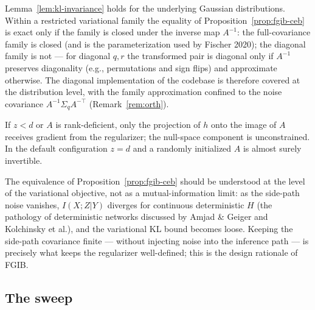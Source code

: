 \begin{remark}\label{rem:closure}
Lemma~\ref{lem:kl-invariance} holds for the underlying Gaussian distributions. Within a
restricted variational family the equality of Proposition~\ref{prop:fgib-ceb} is exact
only if the family is closed under the inverse map $A^{-1}$: the full-covariance family
is closed (and is the parameterization used by Fischer 2020); the diagonal family is not
--- for diagonal $q, r$ the transformed pair is diagonal only if $A^{-1}$ preserves
diagonality (e.g., permutations and sign flips) and approximate otherwise. The diagonal
implementation of the codebase is therefore covered at the distribution level, with the
family approximation confined to the noise covariance $A^{-1}\Sigma_q A^{-\top}$
(Remark~\ref{rem:orth}).
\end{remark}

\begin{remark}\label{rem:rank}
If $z < d$ or $A$ is rank-deficient, only the projection of $h$ onto the image of $A$
receives gradient from the regularizer; the null-space component is unconstrained.
In the default configuration $z = d$ and a randomly initialized $A$ is almost surely
invertible.
\end{remark}

\begin{remark}\label{rem:limit}
The equivalence of Proposition~\ref{prop:fgib-ceb} should be understood at the level of
the variational objective, not as a mutual-information limit: as the side-path noise
vanishes, $I(X;Z|Y)$ diverges for continuous deterministic $H$ (the pathology of
deterministic networks discussed by Amjad \& Geiger and Kolchinsky et al.), and the
variational KL bound becomes loose. Keeping the side-path covariance finite --- without
injecting noise into the inference path --- is precisely what keeps the regularizer
well-defined; this is the design rationale of FGIB.
\end{remark}

\subsection{The sweep}

